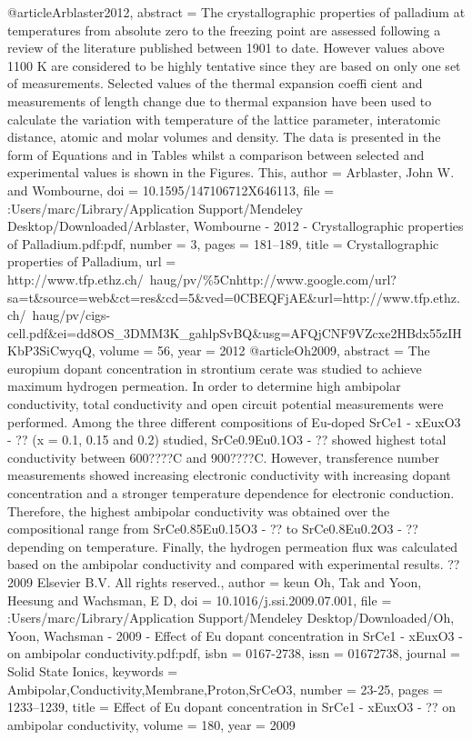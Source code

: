 @article{Arblaster2012,
abstract = {The crystallographic properties of palladium at temperatures from absolute zero to the freezing point are assessed following a review of the literature published between 1901 to date. However values above 1100 K are considered to be highly tentative since they are based on only one set of measurements. Selected values of the thermal expansion coeffi cient and measurements of length change due to thermal expansion have been used to calculate the variation with temperature of the lattice parameter, interatomic distance, atomic and molar volumes and density. The data is presented in the form of Equations and in Tables whilst a comparison between selected and experimental values is shown in the Figures. This},
author = {Arblaster, John W. and Wombourne},
doi = {10.1595/147106712X646113},
file = {:Users/marc/Library/Application Support/Mendeley Desktop/Downloaded/Arblaster, Wombourne - 2012 - Crystallographic properties of Palladium.pdf:pdf},
number = {3},
pages = {181--189},
title = {{Crystallographic properties of Palladium}},
url = {http://www.tfp.ethz.ch/{~}haug/pv/{\%}5Cnhttp://www.google.com/url?sa=t{\&}source=web{\&}ct=res{\&}cd=5{\&}ved=0CBEQFjAE{\&}url=http://www.tfp.ethz.ch/{~}haug/pv/cigs-cell.pdf{\&}ei=dd8OS{\_}3DMM3K{\_}gahlpSvBQ{\&}usg=AFQjCNF9VZcxe2HBdx55zIHKbP3SiCwyqQ},
volume = {56},
year = {2012}
}
@article{Oh2009,
abstract = {The europium dopant concentration in strontium cerate was studied to achieve maximum hydrogen permeation. In order to determine high ambipolar conductivity, total conductivity and open circuit potential measurements were performed. Among the three different compositions of Eu-doped SrCe1 - xEuxO3 - ?? (x = 0.1, 0.15 and 0.2) studied, SrCe0.9Eu0.1O3 - ?? showed highest total conductivity between 600????C and 900????C. However, transference number measurements showed increasing electronic conductivity with increasing dopant concentration and a stronger temperature dependence for electronic conduction. Therefore, the highest ambipolar conductivity was obtained over the compositional range from SrCe0.85Eu0.15O3 - ?? to SrCe0.8Eu0.2O3 - ?? depending on temperature. Finally, the hydrogen permeation flux was calculated based on the ambipolar conductivity and compared with experimental results. ?? 2009 Elsevier B.V. All rights reserved.},
author = {keun Oh, Tak and Yoon, Heesung and Wachsman, E D},
doi = {10.1016/j.ssi.2009.07.001},
file = {:Users/marc/Library/Application Support/Mendeley Desktop/Downloaded/Oh, Yoon, Wachsman - 2009 - Effect of Eu dopant concentration in SrCe1 - xEuxO3 - on ambipolar conductivity.pdf:pdf},
isbn = {0167-2738},
issn = {01672738},
journal = {Solid State Ionics},
keywords = {Ambipolar,Conductivity,Membrane,Proton,SrCeO3},
number = {23-25},
pages = {1233--1239},
title = {{Effect of Eu dopant concentration in SrCe1 - xEuxO3 - ?? on ambipolar conductivity}},
volume = {180},
year = {2009}
}
